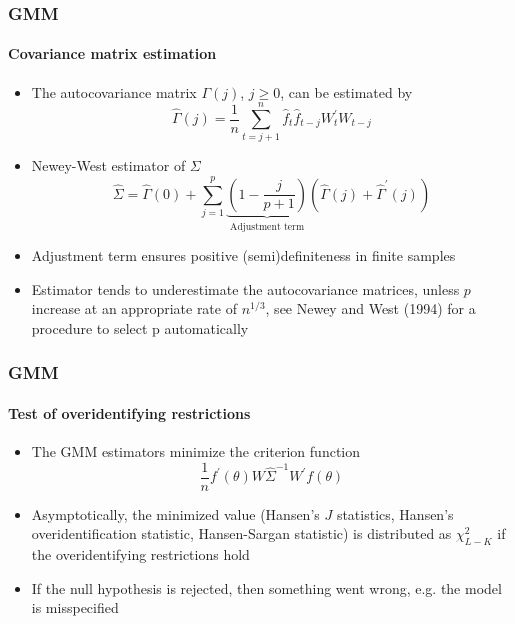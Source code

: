 \documentclass{beamer}
\begin{document}
\begin{frame}\frametitle{GMM}\framesubtitle{Covariance matrix estimation}
\begin{itemize}
    \item The autocovariance matrix $\Gamma (j)$, $j\geq 0$, can be estimated by
    \begin{equation*}
    \hat{\Gamma}(j)=\frac{1}{n}\sum_{t=j+1}^{n}\hat{f}_{t}\hat{f}_{t-j}W_{t}^{\prime }W_{t-j}
    \end{equation*}
    \item Newey-West estimator of $\Sigma $
    \begin{equation*}
    \hat{\Sigma}=\hat{\Gamma}(0)+\sum_{j=1}^{p}\underbrace{\left( 1-\frac{j}{p+1}\right)}_{\text{Adjustment term}} \left( \hat{\Gamma}(j)+\hat{\Gamma}^{\prime }(j)\right)
    \end{equation*}
    \item Adjustment term ensures positive (semi)definiteness in finite samples
    \item Estimator tends to underestimate the autocovariance matrices, unless $p$ increase at an appropriate rate of $n^{1/3}$, see Newey and West (1994) for a procedure to select p automatically

\end{itemize}
\end{frame}


\begin{frame}\frametitle{GMM}\framesubtitle{Test of overidentifying restrictions}
    \begin{itemize}
    \item The GMM estimators minimize the criterion function
    \begin{equation*}
    \frac{1}{n}f^{\prime }(\theta )W\hat{\Sigma}^{-1}W^{\prime }f(\theta )
    \end{equation*}
    \item Asymptotically, the minimized value (Hansen's $J$ statistics, \newline
    Hansen's overidentification statistic, Hansen-Sargan statistic)\newline
    is distributed as $\chi _{L-K}^{2}$ if the overidentifying restrictions hold
    \item If the null hypothesis is rejected, then something went wrong,\newline
    e.g. the model is misspecified
\end{itemize}
\end{frame}
\end{document}
